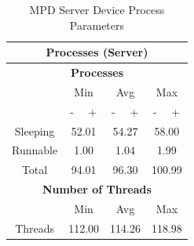 \documentclass[11pt,a4paper]{scrreprt}
\begin{document}
\begin{table}[H]
\centering
    \begin{tabular}{||c|c|c|c|c|c|c||}
    \hline
    \multicolumn{7}{|c|}{\textbf{Processes (Server)}} \\
    \hline
    \multicolumn{7}{|c|}{\textbf{Processes}} \\
    \hline\hline
      & \multicolumn{2}{|c|}{Min} & \multicolumn{2}{|c|}{Avg} & \multicolumn{2}{|c|}{Max} \\
    \hline
      & - & + & - & + & - & + \\
    \hline
    Sleeping & \multicolumn{2}{|c|}{52.01} & \multicolumn{2}{|c|}{54.27} & \multicolumn{2}{|c|}{58.00} \\
    \hline
    Runnable & \multicolumn{2}{|c|}{1.00} & \multicolumn{2}{|c|}{1.04} & \multicolumn{2}{|c|}{1.99} \\
    \hline
    Total & \multicolumn{2}{|c|}{94.01} & \multicolumn{2}{|c|}{96.30} & \multicolumn{2}{|c|}{100.99} \\
    \hline\hline
    \multicolumn{7}{|c|}{\textbf{Number of Threads}} \\
    \hline\hline
      & \multicolumn{2}{|c|}{Min} & \multicolumn{2}{|c|}{Avg} & \multicolumn{2}{|c|}{Max} \\
    \hline
    Threads  & \multicolumn{2}{|c|}{112.00} & \multicolumn{2}{|c|}{114.26} & \multicolumn{2}{|c|}{118.98} \\
    \hline\hline
    \end{tabular}
    \caption{MPD Server Device Process Parameters}
    \label{MPDserverProcessTab}
\end{table}
\end{document}
